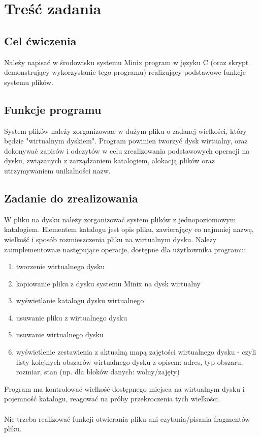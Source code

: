 \documentclass{mwrep}
\begin{document}
\tableofcontents

\chapter{Treść zadania}
\section{Cel ćwiczenia}
Należy napisać w środowisku systemu Minix program w języku C (oraz skrypt
demonstrujący wykorzystanie tego programu) realizujący podstawowe funkcje
systemu plików.

\section{Funkcje programu} 
System plików należy zorganizowaæ w dużym pliku o zadanej wielkości, który
będzie "wirtualnym dyskiem". Program powinien tworzyć dysk wirtualny, oraz
dokonywać zapisów i odczytów w celu zrealizowania podstawowych operacji na
dysku, związanych z zarządzaniem katalogiem, alokacją plików oraz
utrzymywaniem unikalności nazw.

\section{Zadanie do zrealizowania}
W pliku na dysku należy zorganizować system plików z jednopoziomowym
katalogiem.  Elementem katalogu jest opis pliku, zawierający co najmniej
nazwę, wielkość i sposób rozmieszczenia pliku na wirtualnym dysku. Należy
zaimplementowaæ następujące operacje, dostępne dla użytkownika programu:

\begin{enumerate}
    \item tworzenie wirtualnego dysku
    \item kopiowanie pliku z dysku systemu Minix na dysk wirtualny
    \item wyświetlanie katalogu dysku wirtualnego
    \item usuwanie pliku z wirtualnego dysku
    \item usuwanie wirtualnego dysku
    \item wyświetlenie zestawienia z aktualną mapą zajętości wirtualnego dysku -
    czyli listy kolejnych obszarów wirtualnego dysku z opisem: adres, typ
    obszaru, rozmiar, stan (np. dla bloków danych: wolny/zajęty)
\end{enumerate}

Program ma kontrolować wielkość dostępnego miejsca na wirtualnym dysku i
pojemność katalogu, reagować na próby przekroczenia tych wielkości. \\
\\
\indent{} Nie trzeba realizować funkcji otwierania pliku ani czytania/pisania
fragmentów pliku.\\
\end{document}
